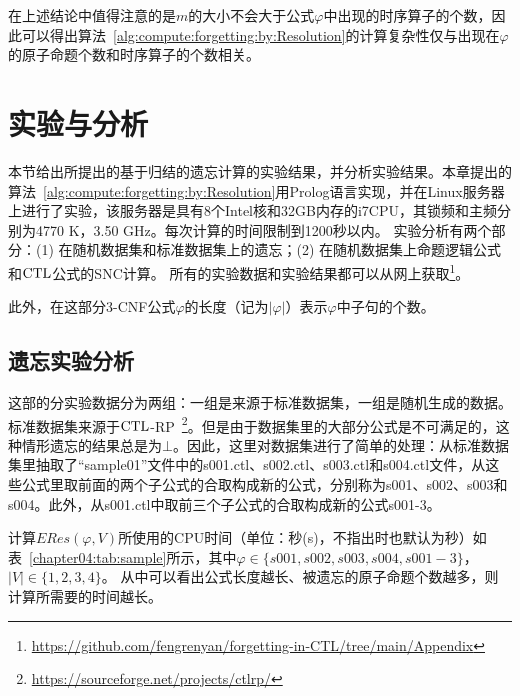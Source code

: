 在上述结论中值得注意的是$m$的大小不会大于公式$\varphi$中出现的时序算子的个数，因此可以得出算法~\ref{alg:compute:forgetting:by:Resolution}的计算复杂性仅与出现在$\varphi$的原子命题个数和时序算子的个数相关。

\section{实验与分析}
本节给出所提出的基于归结的遗忘计算的实验结果，并分析实验结果。本章提出的算法~\ref{alg:compute:forgetting:by:Resolution}用Prolog语言实现，并在Linux服务器上进行了实验，该服务器是具有8个Intel核和32GB内存的i7CPU，其锁频和主频分别为4770 K，3.50 GHz。每次计算的时间限制到1200秒以内。
实验分析有两个部分：(1) 在随机数据集和标准数据集上的遗忘；(2) 在随机数据集上命题逻辑公式和$\textrm{CTL}$公式的SNC计算。
所有的实验数据和实验结果都可以从网上获取\footnote{ \url{https://github.com/fengrenyan/forgetting-in-CTL/tree/main/Appendix}}。

此外，在这部分3-CNF公式$\varphi$的长度（记为$|\varphi|$）表示$\varphi$中子句的个数。

\subsection{遗忘实验分析}
这部的分实验数据分为两组：一组是来源于标准数据集，一组是随机生成的数据。
标准数据集来源于$\textrm{CTL}$-RP~\footnote{\url{https://sourceforge.net/projects/ctlrp/}}。但是由于数据集里的大部分公式是不可满足的，这种情形遗忘的结果总是为$\bot$。因此，这里对数据集进行了简单的处理：从标准数据集里抽取了“sample01”文件中的s001.ctl、s002.ctl、s003.ctl和s004.ctl文件，从这些公式里取前面的两个子公式的合取构成新的公式，分别称为s001、s002、s003和s004。此外，从s001.ctl中取前三个子公式的合取构成新的公式s001-3。

计算$ERes(\varphi, V)$所使用的CPU时间（单位：秒(s)，不指出时也默认为秒）如表~\ref{chapter04:tab:sample}所示，其中$\varphi\in \{s001,s002,s003,s004,s001-3\}$，$|V|\in \{1,2,3,4\}$。
从中可以看出公式长度越长、被遗忘的原子命题个数越多，则计算所需要的时间越长。

